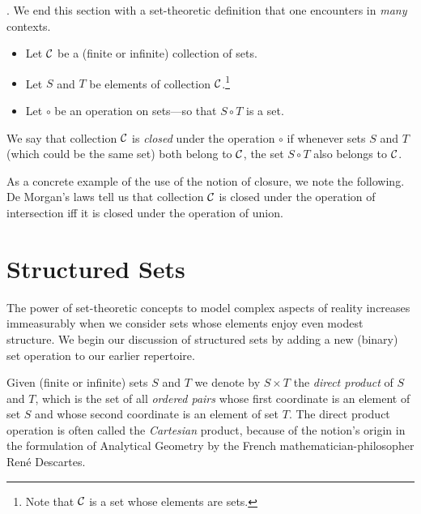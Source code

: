 .
%
We end this section with a set-theoretic definition that one encounters in {\em many} contexts.
\begin{itemize}
\item
Let $\cal C$ be a (finite or infinite) collection of sets.
\item
Let $S$ and $T$ be elements of collection $\cal C$.\footnote{Note that $\cal C$ is a set whose elements are sets.}
\item
Let $\circ$ be an operation on sets---so that $S \circ T$ is a set.
\end{itemize}
We say that collection $\cal C$ is {\em closed} under the operation $\circ$ if whenever sets $S$ and $T$ (which could be the same set) both belong to $\cal C$, the set $S \circ T$ also belongs to $\cal C$.

\medskip

As a concrete example of the use of the notion of closure, we note the following.  De Morgan's laws tell us that collection $\cal C$ is closed under the operation of intersection iff it is closed under the operation of union.

\section{Structured Sets}
\label{sec:structured-set}

The power of set-theoretic concepts to model complex aspects of reality increases immeasurably when we consider sets whose elements enjoy even modest structure.  We begin our discussion of structured sets by adding a new (binary) set operation to our earlier repertoire.

  

Given (finite or infinite) sets $S$ and $T$ we denote by $S \times T$ the {\it direct product} of $S$ and $T$, which is the set of all {\it ordered pairs} whose first coordinate is an element of set $S$ and whose second coordinate is an element of set $T$.  The direct product operation is often called the {\it Cartesian} product, because of the notion's origin in the formulation of Analytical Geometry by the French mathematician-philosopher Ren\'{e} Descartes. 

